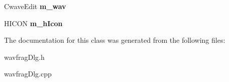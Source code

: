 \begin{DoxyCompactItemize}
\item 
\hypertarget{class_c_wavfrag_dlg_abee707246ec907a6f202ec7a29335ddf}{Cwave\-Edit {\bfseries m\-\_\-wav}}\label{class_c_wavfrag_dlg_abee707246ec907a6f202ec7a29335ddf}

\item 
\hypertarget{class_c_wavfrag_dlg_a23c04e07851d808fa695e09d04b1509c}{H\-I\-C\-O\-N {\bfseries m\-\_\-h\-Icon}}\label{class_c_wavfrag_dlg_a23c04e07851d808fa695e09d04b1509c}

\end{DoxyCompactItemize}


The documentation for this class was generated from the following files\-:\begin{DoxyCompactItemize}
\item 
wavfrag\-Dlg.\-h\item 
wavfrag\-Dlg.\-cpp\end{DoxyCompactItemize}
